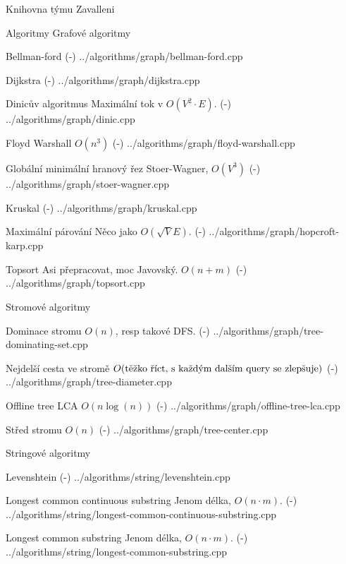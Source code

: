 
\chyph

\def\newpage{\vfil \break}
\def\linebreak{\hfil \break}
\overfullrule=0pt

\tit Knihovna týmu Zavalleni

\maketoc

\chap Algoritmy
\sec Grafové algoritmy

\def\tthook{\ttline=-2}
\secc Bellman-ford
\verbinput (-) ../algorithms/graph/bellman-ford.cpp

\secc Dijkstra
\verbinput (-) ../algorithms/graph/dijkstra.cpp

\secc Dinicův algoritmus
Maximální tok v $O(V^2 \cdot E)$.
\verbinput (-) ../algorithms/graph/dinic.cpp

\secc Floyd Warshall
$O(n^3)$
\verbinput (-) ../algorithms/graph/floyd-warshall.cpp

\secc Globální minimální hranový řez
Stoer-Wagner, $O(V^3)$
\verbinput (-) ../algorithms/graph/stoer-wagner.cpp

\secc Kruskal
\verbinput (-) ../algorithms/graph/kruskal.cpp

\secc Maximální párování
Něco jako $O(\sqrt{V}E)$.
\verbinput (-) ../algorithms/graph/hopcroft-karp.cpp

\secc Topsort
Asi přepracovat, moc Javovský. $O(n + m)$
\verbinput (-) ../algorithms/graph/topsort.cpp

\sec Stromové algoritmy

\secc Dominace stromu
$O(n)$, resp takové DFS.
\verbinput (-) ../algorithms/graph/tree-dominating-set.cpp

\secc Nejdelší cesta ve stromě
$O(\hbox{těžko říct, s každým dalším query se zlepšuje})$
\verbinput (-) ../algorithms/graph/tree-diameter.cpp

\secc Offline tree LCA
$O(n\log(n))$
\verbinput (-) ../algorithms/graph/offline-tree-lca.cpp

\secc Střed stromu
$O(n)$
\verbinput (-) ../algorithms/graph/tree-center.cpp


\sec Stringové algoritmy

\secc Levenshtein
\verbinput (-) ../algorithms/string/levenshtein.cpp

\secc Longest common continuous substring
Jenom délka, $O(n \cdot m)$.
\verbinput (-) ../algorithms/string/longest-common-continuous-substring.cpp

\secc Longest common substring
Jenom délka, $O(n \cdot m)$.
\verbinput (-) ../algorithms/string/longest-common-substring.cpp

